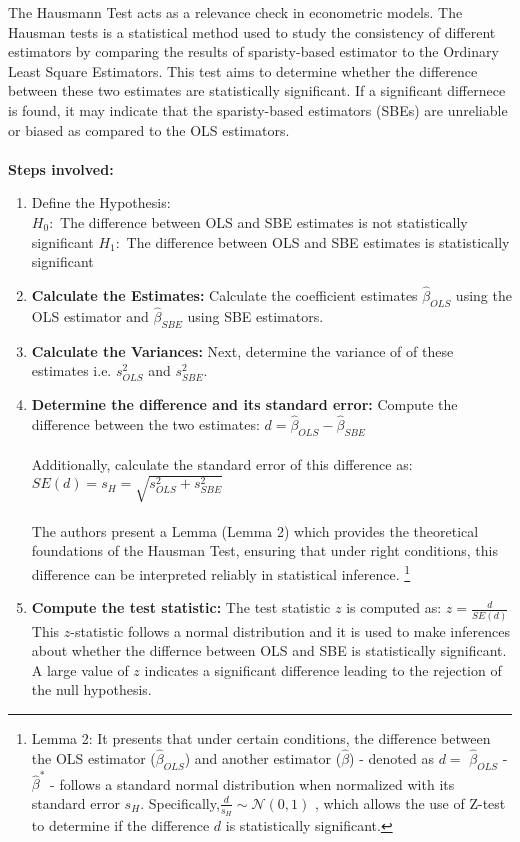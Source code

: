 The Hausmann Test acts as a relevance check in econometric models. The Hausman tests is a statistical method used to study the consistency of different estimators by comparing the results of sparisty-based estimator to the Ordinary Least Square Estimators. This test aims to determine whether the difference between these two estimates are statistically significant. If a significant differnece is found, it may indicate that the sparisty-based estimators (SBEs) are unreliable or biased as compared to the OLS estimators. \\
\\
\textbf{Steps involved:}
\begin{enumerate}
    \item Define the Hypothesis:\\
    $H_0:$ The difference between OLS and SBE estimates is not statistically significant
    $H_1:$ The difference between OLS and SBE estimates is statistically significant
    \item \textbf{Calculate the Estimates:} Calculate the coefficient estimates $\hat{\beta}_{OLS}$ using the OLS estimator and $\hat{\beta}_{SBE}$ using SBE estimators.
    \item \textbf{Calculate the Variances:} Next, determine the variance of of these estimates i.e. $ s^2_{OLS} $ and $ s^2_{SBE} $.
    \item \textbf{Determine the difference and its standard error:} Compute the difference between the two estimates: $d = \hat{\beta}_{OLS} - \hat{\beta}_{SBE}$\\
    \\
    Additionally, calculate the standard error of this difference as: $SE(d) = s_H = \sqrt{s^2_{OLS} + s^2_{SBE}}$\\
    \\
    The authors present a Lemma (Lemma 2) which provides the theoretical foundations of the Hausman Test, ensuring that under right conditions, this difference can be interpreted reliably in statistical inference. \footnote{Lemma 2: It presents that under certain conditions, the difference between the OLS estimator ($\hat{\beta}_{OLS}$) and another estimator ($\hat{\beta}$) - denoted as $d = $ $\hat{\beta}_{OLS}$ - $\hat{\beta}^*$ - follows a standard normal distribution when normalized with its standard error $s_H$. Specifically,$ \frac{d}{s_H} \sim \mathcal{N}(0,1)$ , which allows the use of Z-test to determine if the difference $d$ is statistically significant. }
    \item \textbf{Compute the test statistic:} The test statistic $z$ is computed as: 
    $z = \frac{d}{SE(d)}$\\
    This $z$-statistic follows a normal distribution and it is used to make inferences about whether the differnce between OLS and SBE is statistically significant. A large value of $z$ indicates a significant difference leading to the rejection of the null hypothesis.
\end{enumerate}

